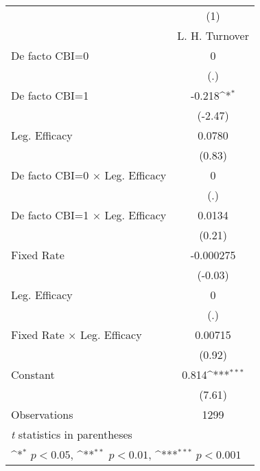 \begin{table}[htbp]\centering
\def\sym#1{\ifmmode^{#1}\else\(^{#1}\)\fi}
\caption{\label{llpFEDF}}
\begin{tabular}{l*{1}{c}}
\toprule
                                        &\multicolumn{1}{c}{(1)}\\
                                        &\multicolumn{1}{c}{L. H. Turnover}\\
\midrule
De facto CBI=0                          &        0         \\
                                        &      (.)         \\
\addlinespace
De facto CBI=1                          &   -0.218\sym{*}  \\
                                        &  (-2.47)         \\
\addlinespace
Leg. Efficacy                           &   0.0780         \\
                                        &   (0.83)         \\
\addlinespace
De facto CBI=0 $\times$ Leg. Efficacy   &        0         \\
                                        &      (.)         \\
\addlinespace
De facto CBI=1 $\times$ Leg. Efficacy   &   0.0134         \\
                                        &   (0.21)         \\
\addlinespace
Fixed Rate                              &-0.000275         \\
                                        &  (-0.03)         \\
\addlinespace
Leg. Efficacy                           &        0         \\
                                        &      (.)         \\
\addlinespace
Fixed Rate $\times$ Leg. Efficacy       &  0.00715         \\
                                        &   (0.92)         \\
\addlinespace
Constant                                &    0.814\sym{***}\\
                                        &   (7.61)         \\
\midrule
Observations                            &     1299         \\
\bottomrule
\multicolumn{2}{l}{\footnotesize \textit{t} statistics in parentheses}\\
\multicolumn{2}{l}{\footnotesize \sym{*} \(p<0.05\), \sym{**} \(p<0.01\), \sym{***} \(p<0.001\)}\\
\end{tabular}
\end{table}
